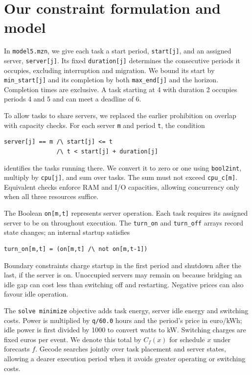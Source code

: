 \documentclass[10pt,a4paper,twocolumn]{article}
\newcommand{\code}[1]{\texttt{#1}}
\begin{document}
\section{Our constraint formulation and model}
In \code{model5.mzn}, we give each task a start period, \code{start[j]}, and an assigned server, \code{server[j]}. Its fixed \code{duration[j]} determines the consecutive periods it occupies, excluding interruption and migration. We bound its start by \code{min\_start[j]} and its completion by both \code{max\_end[j]} and the horizon. Completion times are exclusive. A task starting at 4 with duration 2 occupies periods 4 and 5 and can meet a deadline of 6.

To allow tasks to share servers, we replaced the earlier prohibition on overlap with capacity checks. For each server \code{m} and period \code{t}, the condition
\begingroup\footnotesize
\begin{verbatim}
server[j] == m /\ start[j] <= t
               /\ t < start[j] + duration[j]
\end{verbatim}
\endgroup
identifies the tasks running there. We convert it to zero or one using \code{bool2int}, multiply by \code{cpu[j]}, and sum over tasks. The sum must not exceed \code{cpu\_c[m]}. Equivalent checks enforce RAM and I/O capacities, allowing concurrency only when all three resources suffice.

The Boolean \code{on[m,t]} represents server operation. Each task requires its assigned server to be on throughout execution. The \code{turn\_on} and \code{turn\_off} arrays record state changes; an internal startup satisfies
\begingroup\footnotesize
\begin{verbatim}
turn_on[m,t] = (on[m,t] /\ not on[m,t-1])
\end{verbatim}
\endgroup
Boundary constraints charge startup in the first period and shutdown after the last, if the server is on. Unoccupied servers may remain on because bridging an idle gap can cost less than switching off and restarting. Negative prices can also favour idle operation.

The \code{solve minimize} objective adds task energy, server idle energy and switching costs. Power is multiplied by \code{q/60.0} hours and the period's price in euro/kWh; idle power is first divided by 1000 to convert watts to kW. Switching charges are fixed euros per event. We denote this total by $C_f(x)$ for schedule $x$ under forecasts $f$. Gecode searches jointly over task placement and server states, allowing a dearer execution period when it avoids greater operating or switching costs.
\end{document}
